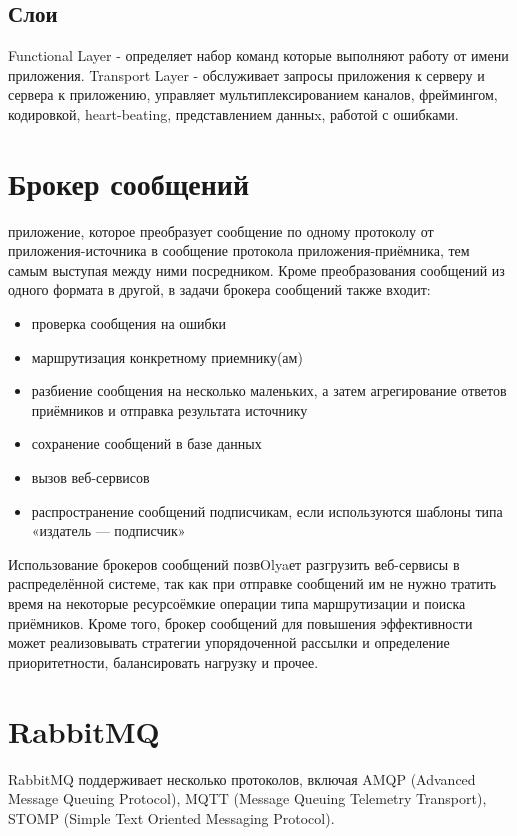 \documentclass[areasetadvanced]{scrartcl}
\begin{document}
\subsection{Слои}
Functional Layer - определяет набор команд которые выполняют работу от имени приложения.
Transport Layer - обслуживает запросы приложения к серверу и сервера к приложению, управляет мультиплексированием каналов, фреймингом, кодировкой, heart-beating, представлением данныx, работой с ошибками.

\newpage
\section{Брокер сообщений}
приложение, которое преобразует сообщение по одному протоколу от приложения-источника в сообщение протокола приложения-приёмника, тем самым выступая между ними посредником. Кроме преобразования сообщений из одного формата в другой, в задачи брокера сообщений также входит:
\begin{itemize} 
	\item проверка сообщения на ошибки
	\item маршрутизация конкретному приемнику(ам)
	\item разбиение сообщения на несколько маленьких, а затем агрегирование ответов приёмников и отправка результата источнику
	\item сохранение сообщений в базе данных
	\item вызов веб-сервисов
	\item распространение сообщений подписчикам, если используются шаблоны типа «издатель — подписчик»
\end{itemize}
Использование брокеров сообщений позвOlyaет разгрузить веб-сервисы в распределённой системе, так как при отправке сообщений им не нужно тратить время на некоторые ресурсоёмкие операции типа маршрутизации и поиска приёмников. Кроме того, брокер сообщений для повышения эффективности может реализовывать стратегии упорядоченной рассылки и определение приоритетности, балансировать нагрузку и прочее.

\newpage
\section{RabbitMQ}
RabbitMQ поддерживает несколько протоколов, включая AMQP (Advanced Message Queuing Protocol), MQTT (Message Queuing Telemetry Transport), STOMP (Simple Text Oriented Messaging Protocol).
\end{document}
